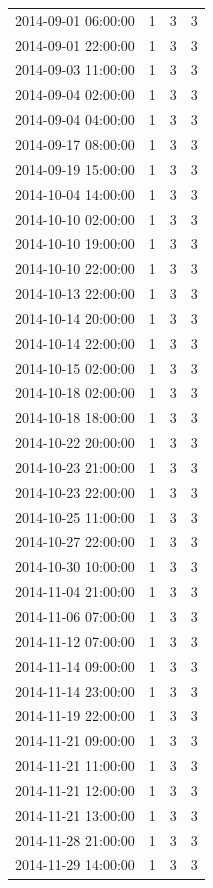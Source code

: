 \begin{tabular}{lrrr}
2014-09-01 06:00:00 & 1 & 3 & 3 \\
2014-09-01 22:00:00 & 1 & 3 & 3 \\
2014-09-03 11:00:00 & 1 & 3 & 3 \\
2014-09-04 02:00:00 & 1 & 3 & 3 \\
2014-09-04 04:00:00 & 1 & 3 & 3 \\
2014-09-17 08:00:00 & 1 & 3 & 3 \\
2014-09-19 15:00:00 & 1 & 3 & 3 \\
2014-10-04 14:00:00 & 1 & 3 & 3 \\
2014-10-10 02:00:00 & 1 & 3 & 3 \\
2014-10-10 19:00:00 & 1 & 3 & 3 \\
2014-10-10 22:00:00 & 1 & 3 & 3 \\
2014-10-13 22:00:00 & 1 & 3 & 3 \\
2014-10-14 20:00:00 & 1 & 3 & 3 \\
2014-10-14 22:00:00 & 1 & 3 & 3 \\
2014-10-15 02:00:00 & 1 & 3 & 3 \\
2014-10-18 02:00:00 & 1 & 3 & 3 \\
2014-10-18 18:00:00 & 1 & 3 & 3 \\
2014-10-22 20:00:00 & 1 & 3 & 3 \\
2014-10-23 21:00:00 & 1 & 3 & 3 \\
2014-10-23 22:00:00 & 1 & 3 & 3 \\
2014-10-25 11:00:00 & 1 & 3 & 3 \\
2014-10-27 22:00:00 & 1 & 3 & 3 \\
2014-10-30 10:00:00 & 1 & 3 & 3 \\
2014-11-04 21:00:00 & 1 & 3 & 3 \\
2014-11-06 07:00:00 & 1 & 3 & 3 \\
2014-11-12 07:00:00 & 1 & 3 & 3 \\
2014-11-14 09:00:00 & 1 & 3 & 3 \\
2014-11-14 23:00:00 & 1 & 3 & 3 \\
2014-11-19 22:00:00 & 1 & 3 & 3 \\
2014-11-21 09:00:00 & 1 & 3 & 3 \\
2014-11-21 11:00:00 & 1 & 3 & 3 \\
2014-11-21 12:00:00 & 1 & 3 & 3 \\
2014-11-21 13:00:00 & 1 & 3 & 3 \\
2014-11-28 21:00:00 & 1 & 3 & 3 \\
2014-11-29 14:00:00 & 1 & 3 & 3 \\

\end{tabular}
